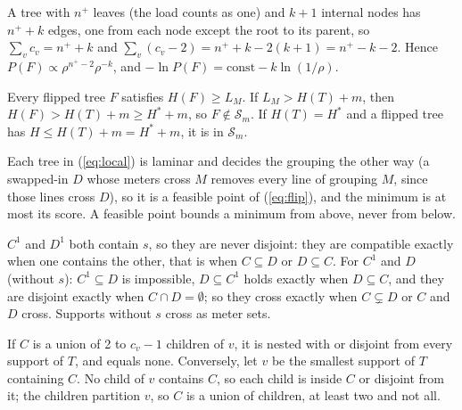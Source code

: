 \documentclass[journal,onecolumn,11pt]{IEEEtran}
\newcommand{\Sset}{\mathcal{S}}
\begin{document}
\begin{IEEEproof}
A tree with $n^+$ leaves (the load counts as one) and $k+1$ internal nodes has $n^++k$ edges, one from each node except the
root to its parent, so $\sum_vc_v=n^++k$ and $\sum_v(c_v-2)=n^++k-2(k+1)=n^+-k-2$. Hence
$P(F)\propto\rho^{n^+-2}\rho^{-k}$, and $-\ln P(F)=\mathrm{const}-k\ln(1/\rho)$.
\end{IEEEproof}

\begin{IEEEproof}
Every flipped tree $F$ satisfies $H(F)\ge L_M$. If $L_M>H(T)+m$, then $H(F)>H(T)+m\ge H^*+m$, so $F\notin\Sset_m$. If
$H(T)=H^*$ and a flipped tree has $H\le H(T)+m=H^*+m$, it is in $\Sset_m$.
\end{IEEEproof}

\begin{IEEEproof}
Each tree in (\ref{eq:local}) is laminar and decides the grouping the other way (a swapped-in $D$ whose meters cross $M$
removes every line of grouping $M$, since those lines cross $D$), so it is a feasible point of (\ref{eq:flip}), and the
minimum is at most its score. A feasible point bounds a minimum from above, never from below.
\end{IEEEproof}

\begin{IEEEproof}
$C^1$ and $D^1$ both contain $s$, so they are never disjoint: they are compatible exactly when one contains the other, that
is when $C\subseteq D$ or $D\subseteq C$. For $C^1$ and $D$ (without $s$): $C^1\subseteq D$ is impossible, $D\subseteq C^1$
holds exactly when $D\subseteq C$, and they are disjoint exactly when $C\cap D=\emptyset$; so they cross exactly when
$C\subsetneq D$ or $C$ and $D$ cross. Supports without $s$ cross as meter sets.
\end{IEEEproof}

\begin{IEEEproof}
If $C$ is a union of 2 to $c_v-1$ children of $v$, it is nested with or disjoint from every support of $T$, and equals none.
Conversely, let $v$ be the smallest support of $T$ containing $C$. No child of $v$ contains $C$, so each child is inside $C$
or disjoint from it; the children partition $v$, so $C$ is a union of children, at least two and not all.
\end{IEEEproof}
\end{document}
